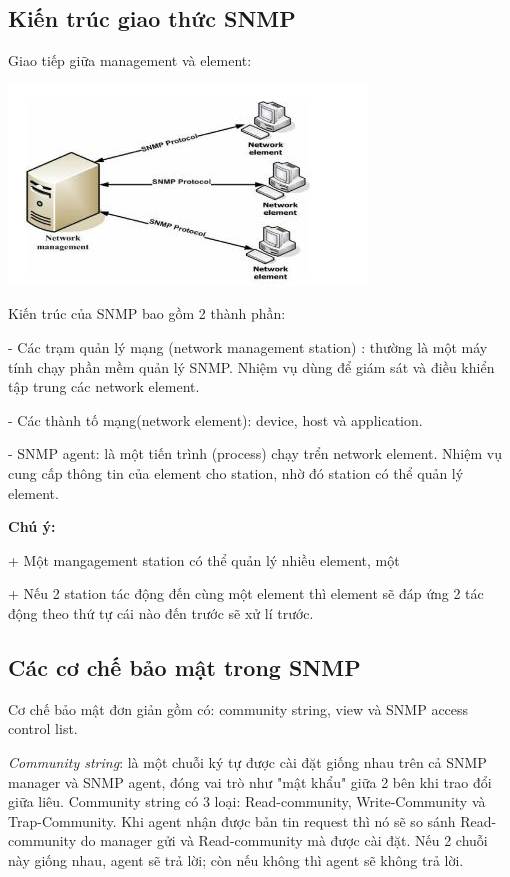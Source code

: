 \documentclass[12pt,oneside,a4paper,reqno]{report}
\begin{document}
\begin{large}
\subsection{Kiến trúc giao thức SNMP}

 Giao tiếp giữa management và element:
\begin{center}
	\includegraphics[scale=1]{images/kientrucsnmp.jpg}
\end{center}
Kiến trúc của SNMP bao gồm 2 thành phần:

- Các trạm quản lý mạng (network management station) : thường là một máy tính chạy phần mềm quản lý SNMP. Nhiệm vụ dùng để giám sát và điều khiển tập trung các network element.

- Các thành tố mạng(network element): device, host và application.

- SNMP agent: là một tiến trình (process) chạy trển network element. Nhiệm vụ cung cấp thông tin của element cho station, nhờ đó station có thể quản lý element.

{\bf Chú ý:} 

+ Một mangagement station có thể quản lý nhiều element, một 

+ Nếu 2 station tác động đến cùng một element thì element sẽ đáp ứng 2 tác động theo thứ tự cái nào đến trước sẽ xử lí trước.

\subsection{Các cơ chế bảo mật trong SNMP}
Cơ chế bảo mật đơn giản gồm có: community string, view và SNMP access control list.

{\it Community string}: là một chuỗi ký tự được cài đặt giống nhau trên cả SNMP manager và SNMP agent, đóng vai trò như "mật khẩu" giữa 2 bên khi trao đổi giữa liêu. Community string có 3 loại: Read-community, Write-Community và Trap-Community. Khi agent nhận được bản tin request thì nó sẽ so sánh Read-community do manager gửi và Read-community mà được cài đặt. Nếu 2 chuỗi này giống nhau, agent sẽ trả lời; còn nếu không thì agent sẽ không trả lời.


\end{large}
\end{document}
